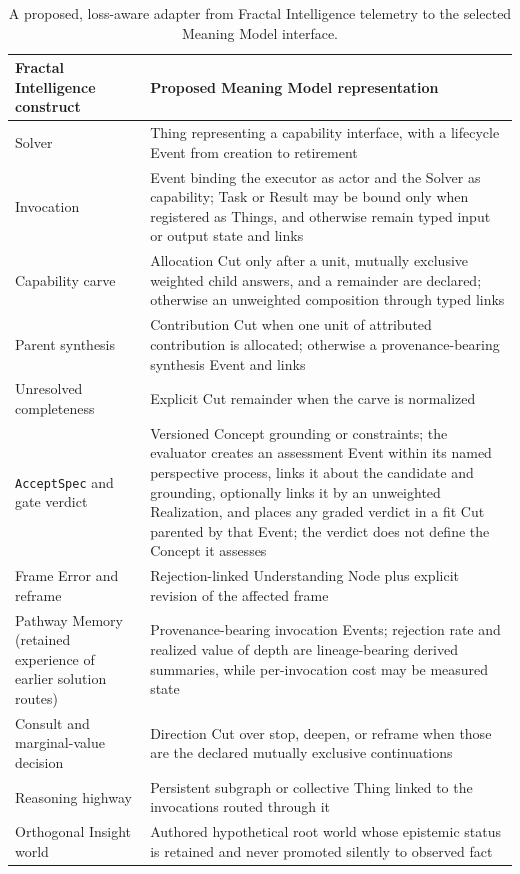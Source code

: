\documentclass[10pt]{article}
\begin{document}
\begin{table}[H]
\centering
\scriptsize
\begin{tabularx}{\textwidth}{@{}p{}Y@{}}
\toprule
Fractal Intelligence construct & Proposed Meaning Model representation \\
\midrule
Solver & Thing representing a capability interface, with a lifecycle Event from creation to retirement \\
Invocation & Event binding the executor as actor and the Solver as capability; Task or Result may be bound only when registered as Things, and otherwise remain typed input or output state and links \\
Capability carve & Allocation Cut only after a unit, mutually exclusive weighted child answers, and a remainder are declared; otherwise an unweighted composition through typed links \\
Parent synthesis & Contribution Cut when one unit of attributed contribution is allocated; otherwise a provenance-bearing synthesis Event and links \\
Unresolved completeness & Explicit Cut remainder when the carve is normalized \\
\texttt{AcceptSpec} and gate verdict & Versioned Concept grounding or constraints; the evaluator creates an assessment Event within its named perspective process, links it about the candidate and grounding, optionally links it by an unweighted Realization, and places any graded verdict in a fit Cut parented by that Event; the verdict does not define the Concept it assesses \\
Frame Error and reframe & Rejection-linked Understanding Node plus explicit revision of the affected frame \\
Pathway Memory (retained experience of earlier solution routes) & Provenance-bearing invocation Events; rejection rate and realized value of depth are lineage-bearing derived summaries, while per-invocation cost may be measured state \\
Consult and marginal-value decision & Direction Cut over stop, deepen, or reframe when those are the declared mutually exclusive continuations \\
Reasoning highway & Persistent subgraph or collective Thing linked to the invocations routed through it \\
Orthogonal Insight world & Authored hypothetical root world whose epistemic status is retained and never promoted silently to observed fact \\
\bottomrule
\end{tabularx}
\caption{A proposed, loss-aware adapter from Fractal Intelligence telemetry to
the selected Meaning Model interface.}
\label{tab:fractal-meaning-adapter}
\end{table}
\end{document}
